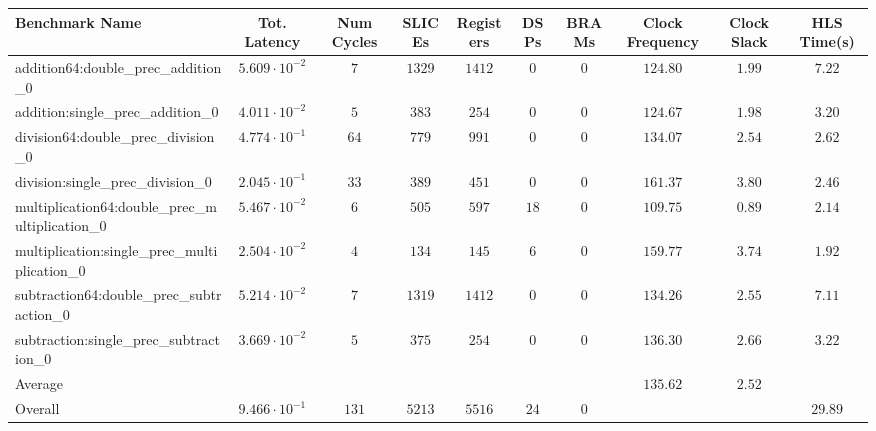 \begin{tabular}{|l|c|c|c|c|c|c|c|c|c|}
\hline
Benchmark Name                                   & Tot. Latency            & Num Cycles & SLICEs   & Registers & DSPs   & BRAMs & Clock Frequency & Clock Slack & HLS Time(s) \\
\hline
addition64:double\_prec\_addition\_0             & $ 5.609 \cdot 10^{-2} $ & $ 7      $ & $ 1329 $ & $ 1412  $ & $ 0  $ & $ 0 $ & $ 124.80      $ & $ 1.99    $ & $ 7.22    $ \\
addition:single\_prec\_addition\_0               & $ 4.011 \cdot 10^{-2} $ & $ 5      $ & $ 383  $ & $ 254   $ & $ 0  $ & $ 0 $ & $ 124.67      $ & $ 1.98    $ & $ 3.20    $ \\
division64:double\_prec\_division\_0             & $ 4.774 \cdot 10^{-1} $ & $ 64     $ & $ 779  $ & $ 991   $ & $ 0  $ & $ 0 $ & $ 134.07      $ & $ 2.54    $ & $ 2.62    $ \\
division:single\_prec\_division\_0               & $ 2.045 \cdot 10^{-1} $ & $ 33     $ & $ 389  $ & $ 451   $ & $ 0  $ & $ 0 $ & $ 161.37      $ & $ 3.80    $ & $ 2.46    $ \\
multiplication64:double\_prec\_multiplication\_0 & $ 5.467 \cdot 10^{-2} $ & $ 6      $ & $ 505  $ & $ 597   $ & $ 18 $ & $ 0 $ & $ 109.75      $ & $ 0.89    $ & $ 2.14    $ \\
multiplication:single\_prec\_multiplication\_0   & $ 2.504 \cdot 10^{-2} $ & $ 4      $ & $ 134  $ & $ 145   $ & $ 6  $ & $ 0 $ & $ 159.77      $ & $ 3.74    $ & $ 1.92    $ \\
subtraction64:double\_prec\_subtraction\_0       & $ 5.214 \cdot 10^{-2} $ & $ 7      $ & $ 1319 $ & $ 1412  $ & $ 0  $ & $ 0 $ & $ 134.26      $ & $ 2.55    $ & $ 7.11    $ \\
subtraction:single\_prec\_subtraction\_0         & $ 3.669 \cdot 10^{-2} $ & $ 5      $ & $ 375  $ & $ 254   $ & $ 0  $ & $ 0 $ & $ 136.30      $ & $ 2.66    $ & $ 3.22    $ \\
\hline
Average                                          & $                     $ & $        $ & $      $ & $       $ & $    $ & $   $ & $ 135.62      $ & $ 2.52    $ & $         $ \\
\hline
Overall                                          & $ 9.466 \cdot 10^{-1} $ & $ 131    $ & $ 5213 $ & $ 5516  $ & $ 24 $ & $ 0 $ & $             $ & $         $ & $ 29.89   $ \\
\hline
\end{tabular}
